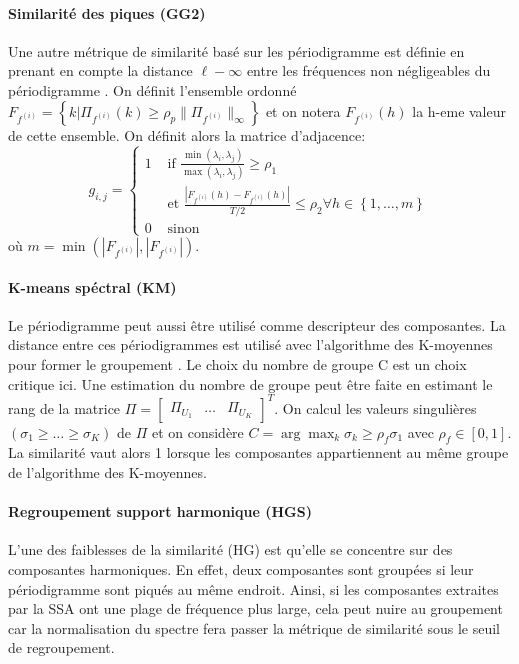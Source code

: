 \documentclass{gretsi}
\newcommand{\val}[3]{(#1_1 #3 \dots #3 #1_#2)}
\newcommand{\set}[1]{\left \{ 1, \dots, #1 \right \}}
\newcommand{\inter}{\left[0, 1\right]}
\begin{document}
\paragraph{Similarité des piques (GG2)}\label{par:GG2}
    Une autre métrique de similarité basé sur les périodigramme est définie en prenant en compte la distance $\ell-\infty$ entre les fréquences non négligeables du périodigramme \cite{abalov_14_auto}. On définit l'ensemble ordonné $F_{f^{(i)}} = \left \{ k | \Pi_{f^{(i)}}(k) \ge \rho_p \|\Pi_{f^{(i)}}\|_\infty \right \}$ et on notera $F_{f^{(i)}}(h)$ la h-eme valeur de cette ensemble. On définit alors la matrice d'adjacence:
    $$
    g_{i, j} = \begin{cases}
	    1 & \text{ if } \displaystyle\frac{\min(\lambda_i, \lambda_j)}{\max(\lambda_i, \lambda_j)} \ge \rho_1\\
	      & \text{ et } \frac{|F_{f^{(i)}}(h) - F_{f^{(i)}}(h)|}{T/2} \le \rho_2 \forall h \in \set{m}\\
	    0 & \text{ sinon}
    \end{cases}
    $$ où $m = \min\left(\left|F_{f^{(i)}}\right|, \left|F_{f^{(i)}}\right|\right)$.

\paragraph{K-means spéctral (KM)}\label{par:KM}
    Le périodigramme peut aussi être utilisé comme descripteur des composantes. La distance entre ces périodigrammes est utilisé avec l'algorithme des K-moyennes pour former le groupement \cite{alvarez_13_auto}. Le choix du nombre de groupe C est un choix critique ici. Une estimation du nombre de groupe peut être faite en estimant le rang de la matrice $\Pi = \begin{bmatrix}\Pi_{U_1}&\dots&\Pi_{U_K}\end{bmatrix}^T$. On calcul les valeurs singulières $\val{\sigma}{K}{\ge}$ de $\Pi$ et on considère $C = \arg\max_k \sigma_k \ge \rho_f \sigma_1$ avec $\rho_f \in \inter$. La similarité vaut alors 1 lorsque les composantes appartiennent au même groupe de l'algorithme des K-moyennes.


\paragraph{Regroupement support harmonique (HGS)}\label{par:HGS}
    L'une des faiblesses de la similarité (HG) est qu'elle se concentre sur des composantes harmoniques. En effet, deux composantes sont groupées si leur périodigramme sont piqués au même endroit. Ainsi, si les composantes extraites par la SSA ont une plage de fréquence plus large, cela peut nuire au groupement car la normalisation du spectre fera passer la métrique de similarité sous le seuil de regroupement.
    
\end{document}
